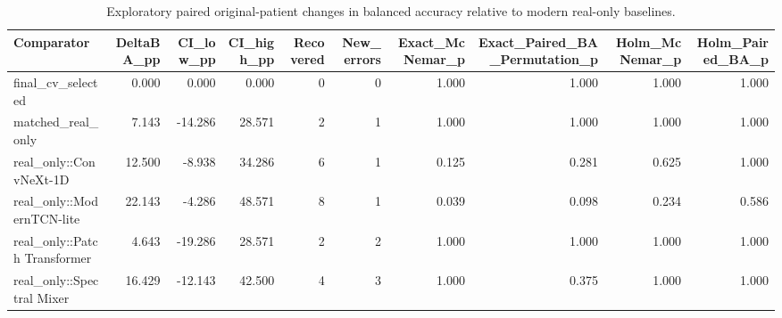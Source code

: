 \begin{table}[t]
\centering
\caption{Exploratory paired original-patient changes in balanced accuracy relative to modern real-only baselines.}
\footnotesize
\begin{tabular}{lrrrrrrrrr}
\toprule
Comparator & DeltaBA\_pp & CI\_low\_pp & CI\_high\_pp & Recovered & New\_errors & Exact\_McNemar\_p & Exact\_Paired\_BA\_Permutation\_p & Holm\_McNemar\_p & Holm\_Paired\_BA\_p \\
\midrule
final\_cv\_selected & 0.000 & 0.000 & 0.000 & 0 & 0 & 1.000 & 1.000 & 1.000 & 1.000 \\
matched\_real\_only & 7.143 & -14.286 & 28.571 & 2 & 1 & 1.000 & 1.000 & 1.000 & 1.000 \\
real\_only::ConvNeXt-1D & 12.500 & -8.938 & 34.286 & 6 & 1 & 0.125 & 0.281 & 0.625 & 1.000 \\
real\_only::ModernTCN-lite & 22.143 & -4.286 & 48.571 & 8 & 1 & 0.039 & 0.098 & 0.234 & 0.586 \\
real\_only::Patch Transformer & 4.643 & -19.286 & 28.571 & 2 & 2 & 1.000 & 1.000 & 1.000 & 1.000 \\
real\_only::Spectral Mixer & 16.429 & -12.143 & 42.500 & 4 & 3 & 1.000 & 0.375 & 1.000 & 1.000 \\
\bottomrule
\end{tabular}
\end{table}
